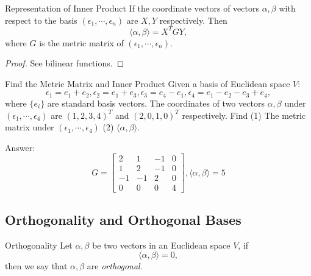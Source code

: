 \begin{proposition}{Representation of Inner Product}{}
  If the coordinate vectors of vectors $\alpha, \beta$ with respect to the basis
  $(\epsilon_1,\cdots,\epsilon_n)$ are $X, Y$ respectively.
  Then 
  \begin{equation}
    \langle \alpha, \beta \rangle = X^TGY,
  \end{equation}
  where $G$ is the metric matrix of $(\epsilon_1,\cdots,\epsilon_n)$.
\end{proposition}

\begin{proof}
  See bilinear functions.
\end{proof}

\begin{example}{Find the Metric Matrix and Inner Product}{}
  Given a basis of Euclidean space $V$:
  \begin{equation}
    \epsilon_1=e_1+e_2,\epsilon_2=e_1+e_3,\epsilon_3=e_4-e_1,\epsilon_4=e_1-e_2-e_3+e_4,
  \end{equation}
  where $\{e_i\}$ are standard basis vectors.
  The coordinates of two vectors $\alpha, \beta$ under
  $(\epsilon_1,\cdots,\epsilon_4)$ are $(1,2,3,4)^T$ and $(2,0,1,0)^T$ respectively.
  Find (1) The metric matrix under $(\epsilon_1,\cdots,\epsilon_4)$
  (2) $\langle \alpha, \beta \rangle$.
\end{example}

\begin{solution}
  Answer:
  \begin{equation}
    G=\begin{bmatrix}2&1&-1&0\\1&2&-1&0\\-1&-1&2&0\\0&0&0&4\end{bmatrix},\langle \alpha,\beta \rangle=5
  \end{equation}
\end{solution}

\subsection{Orthogonality and Orthogonal Bases}

\begin{definition}{Orthogonality}{}
  Let $\alpha, \beta$ be two vectors in an Euclidean space $V$,
  if
  \begin{equation}
    \langle \alpha, \beta \rangle = 0,
  \end{equation}
  then we say that $\alpha, \beta$ are \emph{orthogonal}.
\end{definition}

